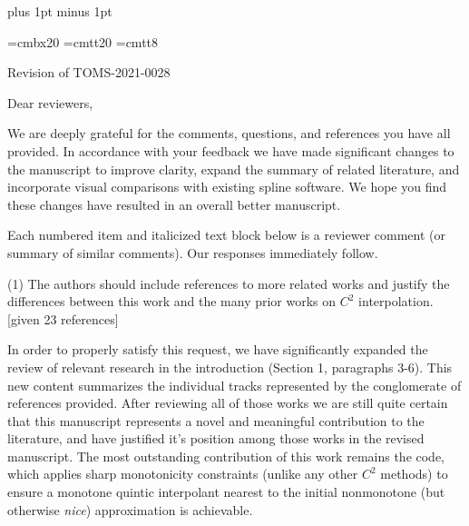 
\parindent=0pt
\parskip=9pt
\baselineskip=13pt plus 1pt minus 1pt \lineskiplimit=1pt


\def\BEGINC{\textRed}
\def\ENDC{\textBlack}
\def\red#1{\BEGINC#1\ENDC}
\let\beginred=\BEGINC
\let\endred=\ENDC

\font\titlebf=cmbx20
\font\titlett=cmtt20
\font\ttVIII=cmtt8



{\titlebf Revision of {\titlett TOMS-2021-0028} \bigskip}

Dear reviewers,

We are deeply grateful for the comments, questions, and references you
have all provided. In accordance with your feedback we have made
significant changes to the manuscript to improve clarity, expand the
summary of related literature, and incorporate visual comparisons with
existing spline software. We hope you find these changes have resulted
in an overall better manuscript.

Each numbered item and italicized text block below is a reviewer
comment (or summary of similar comments). Our responses immediately
follow.


\goodbreak
{\parindent=20pt \it

\item{(1)} The authors should include references to more related works
  and justify the differences between this work and the many prior
  works on $C^2$ interpolation. [given 23 references]

}

In order to properly satisfy this request, we have significantly
expanded the review of relevant research in the introduction (Section
1, paragraphs 3-6). This new content summarizes the individual tracks
represented by the conglomerate of references provided. After
reviewing all of those works we are still quite certain that this
manuscript represents a novel and meaningful contribution to the
literature, and have justified it's position among those works in the
revised manuscript. The most outstanding contribution of this work
remains the code, which applies sharp monotonicity constraints (unlike
any other $C^2$ methods) to ensure a monotone quintic interpolant
nearest to the initial nonmonotone (but otherwise {\it nice})
approximation is achievable.


